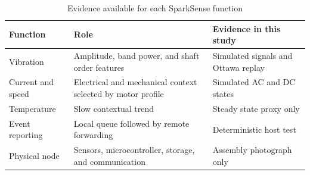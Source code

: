 \documentclass[10pt,twocolumn]{article}
\begin{document}
\begin{table}[H]
\caption{Evidence available for each SparkSense function}
\label{tab:position}
\centering
\scriptsize
\begin{tabularx}{\columnwidth}{@{}p{}X p{}@{}}
\toprule
Function & Role & Evidence in this study \\
\midrule
Vibration & Amplitude, band power, and shaft order features & Simulated signals and Ottawa replay \\
Current and speed & Electrical and mechanical context selected by motor profile & Simulated AC and DC states \\
Temperature & Slow contextual trend & Steady state proxy only \\
Event reporting & Local queue followed by remote forwarding & Deterministic host test \\
Physical node & Sensors, microcontroller, storage, and communication & Assembly photograph only \\
\bottomrule
\end{tabularx}
\end{table}
\end{document}
